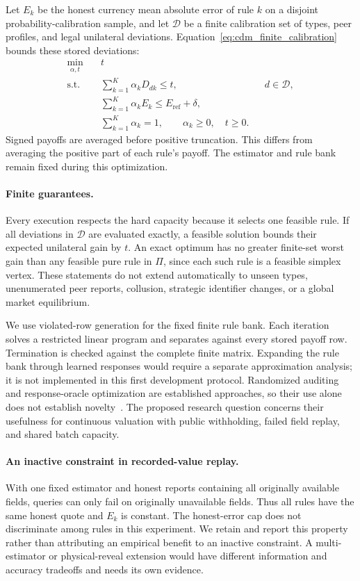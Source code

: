 \documentclass[10pt,journal]{IEEEtran}
\begin{document}
Let $E_k$ be the honest currency mean absolute error of rule $k$ on a disjoint
probability-calibration sample, and let $\mathcal{D}$ be a finite calibration
set of types, peer profiles, and legal unilateral deviations.
Equation~\eqref{eq:cdm_finite_calibration} bounds these stored deviations:
\begin{align}
\min_{\alpha,t}\quad &t \nonumber\\
\text{s.t.}\quad &\sum_{k=1}^K\alpha_kD_{dk}\leq t,
                   && d\in\mathcal{D},\nonumber\\
&\sum_{k=1}^K\alpha_kE_k\leq E_{\mathrm{ref}}+\delta,\nonumber\\
&\sum_{k=1}^K\alpha_k=1,\qquad\alpha_k\geq0,\quad t\geq0.
\label{eq:cdm_finite_calibration}
\end{align}
Signed payoffs are averaged before positive truncation. This differs from
averaging the positive part of each rule's payoff. The estimator and rule bank
remain fixed during this optimization.

\paragraph{Finite guarantees.}
Every execution respects the hard capacity because it selects one feasible
rule. If all deviations in $\mathcal{D}$ are evaluated exactly, a feasible
solution bounds their expected unilateral gain by $t$. An exact optimum has
no greater finite-set worst gain than any feasible pure rule in $\Pi$, since
each such rule is a feasible simplex vertex. These statements do not extend
automatically to unseen types, unenumerated peer reports, collusion, strategic
identifier changes, or a global market equilibrium.

We use violated-row generation for the fixed finite rule bank. Each iteration
solves a restricted linear program and separates against every stored payoff
row. Termination is checked against the complete finite matrix. Expanding the
rule bank through learned responses would require a separate approximation
analysis; it is not implemented in this first development protocol. Randomized
auditing and response-oracle optimization are established approaches, so their
use alone does not establish novelty~\cite{jain2011doubleoracle,ebrahimi2026audit}.
The proposed research question concerns
their usefulness for continuous valuation with public withholding, failed
field replay, and shared batch capacity.

\paragraph{An inactive constraint in recorded-value replay.}
With one fixed estimator and honest reports containing all originally available
fields, queries can only fail on originally unavailable fields. Thus all rules
have the same honest quote and $E_k$ is constant. The honest-error cap does not
discriminate among rules in this experiment. We retain and report this property
rather than attributing an empirical benefit to an inactive constraint. A
multi-estimator or physical-reveal extension would have different information
and accuracy tradeoffs and needs its own evidence.
\end{document}
